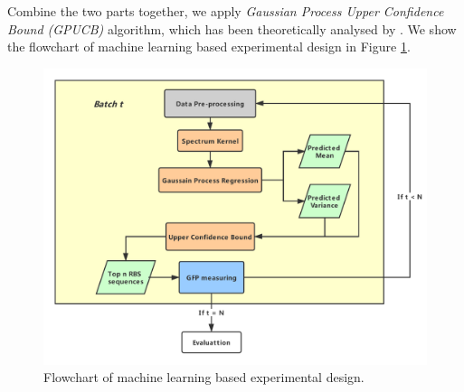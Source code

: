 Combine the two parts together, we apply \textit{Gaussian Process Upper Confidence Bound (GPUCB)} algorithm, which has been theoretically analysed by \textcite{srinivas2012information}. We show the flowchart of machine learning based experimental design in Figure \ref{fig: flowchart of machine learning based experimental design.}.


\begin{figure}[t]
    \centering
    \includegraphics[scale=0.35]{plots/flowchart.pdf}
    \caption{Flowchart of machine learning based experimental design.}
    \label{fig: flowchart of machine learning based experimental design.}
\end{figure}





